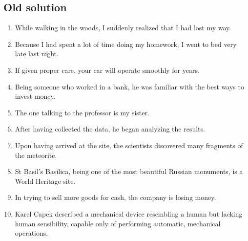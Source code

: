 \subsection*{Old solution}
\begin{enumerate}
      \item While walking in the woods, I suddenly realized that I had lost my way.
      \item Because I had spent a lot of time doing my homework, I went to bed very
            late last night.
      \item If given proper care, your car will operate smoothly for years.
      \item Being someone who worked in a bank, he was familiar with the best ways to
            invest money.
      \item The one talking to the professor is my sister.
      \item After having collected the data, he began analyzing the results.
      \item Upon having arrived at the site, the scientists discovered many fragments
            of the meteorite.
      \item St Basil’s Basilica, being one of the most beautiful Russian monuments, is
            a World Heritage site.
      \item In trying to sell more goods for cash, the company is losing money.
      \item Karel Capek described a mechanical device resembling a human but lacking
            human sensibility, capable only of performing automatic, mechanical
            operations.
\end{enumerate}

